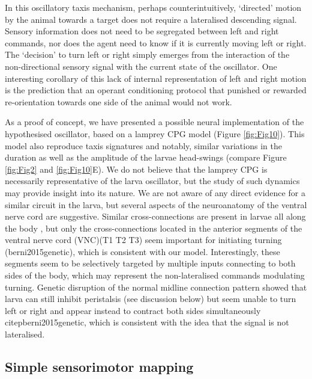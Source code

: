 \documentclass[10pt,a4paper]{article}
\begin{document}
In this oscillatory taxis mechanism, perhaps counterintuitively, ‘directed’ motion by the animal towards a target does not require a lateralised descending signal. Sensory information does not need to be segregated between left and right commands, nor does the agent need to know if it is currently moving left or right. The ‘decision’ to turn left or right simply emerges from the interaction of the non-directional sensory signal with the current state of the oscillator. 
One interesting corollary of this lack of internal representation of left and right motion is the prediction that an operant conditioning protocol that punished or rewarded re-orientation towards one side of the animal would not work.

As a proof of concept, we have presented a possible neural implementation of the hypothesised oscillator, based on a lamprey CPG model (Figure \ref{fig:Fig10}). This model also reproduce taxis signatures and notably, similar variations in the duration as well as the amplitude of the larvae head-swings (compare Figure \ref{fig:Fig2} and \ref{fig:Fig10}E). We do not believe that the lamprey CPG is necessarily representative of the larva oscillator, but the study of such dynamics may provide insight into its nature. We are not aware of any direct evidence for a similar circuit in the larva, but several aspects of the neuroanatomy of the ventral nerve cord are suggestive. Similar cross-connections are present in larvae all along the body , but only the cross-connections located in the anterior segments of the ventral nerve cord (VNC)(T1 T2 T3) seem important for initiating turning (berni2015genetic), which is consistent with our model. Interestingly, these segments seem to be selectively targeted by multiple inputs connecting to both sides of the body, which may represent the non-lateralised commands modulating turning. Genetic disruption of the normal midline connection pattern showed that larva can still inhibit peristalsis (see discussion below) but seem unable to turn left or right and appear instead to contract both sides simultaneously citep{berni2015genetic}, which is consistent with the idea that the signal is not lateralised. 

\subsection{Simple sensorimotor mapping}
\end{document}
